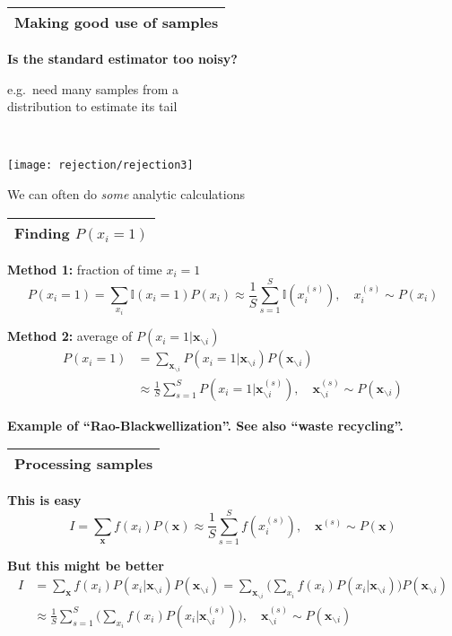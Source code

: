 \documentclass[25pt,landscape]{foils}
\newcommand{\Gray}{\textcolor{mygray}}
\newcommand{\Green}{\textcolor{mypine}}
\newcommand{\myfoilhead}[1]{
\newpage
\vspace*{-1cm}
\Gray{
\begin{tabular*}{\textwidth}{l}
{\bf \Huge #1} \\
\bottomrule
\end{tabular*}}}
\newcommand{\myindent}[1]{
\hspace*{0.1\linewidth}\begin{minipage}{0.89\linewidth}
    #1
\end{minipage}}
\newcommand{\I}{\mathbb I}
\newcommand{\bx}{\mathbf{x}}
\newcommand{\te}{\!=\!}
\begin{document}
\myfoilhead{Making good use of samples}

\vspace*{2cm}

\Green{\bf Is the standard estimator too noisy?}\\[0.2in]
\myindent{e.g.\ need many samples from a\\ distribution to estimate its tail}\\

\vspace*{-2.5cm}

\hfill \texttt{[image: rejection/rejection3]}

\vspace*{0.5cm}
\myindent{We can often do \emph{some} analytic calculations}

\vfill


\myfoilhead{Finding $P(x_i\te 1)$}

\vfill

\Green{{\bf Method 1:}} fraction of time $x_i\te 1$
\[
P(x_i\te 1) = \sum_{x_i} \I(x_i\te 1) P(x_i) \approx \frac{1}{S} \sum_{s=1}^S \I(x_i^{(s)}), \quad x_i^{(s)}\sim P(x_i)
\]

\vfill

\Green{{\bf Method 2:}} average of $P(x_i\te 1|\bx_{\backslash i})$
\[
\begin{split}
P(x_i\te 1) &= \sum_{\bx_{\backslash i}} P(x_i\te 1|\bx_{\backslash i}) P(\bx_{\backslash i})\\
    &\approx \frac{1}{S} \sum_{s=1}^S P(x_i=1|\bx_{\backslash i}^{(s)}), \quad\bx_{\backslash i}^{(s)}\sim P(\bx_{\backslash i})
\end{split}
\]

\vfill
{\textbf{Example of ``Rao-Blackwellization''.  See also ``waste recycling''.}}

\myfoilhead{Processing samples}

\vspace*{1.5cm}

\Green{\bf This is easy}\\[-0.4in]
\[
I = \sum_{\bx} f(x_i) P(\bx) \approx \frac{1}{S} \sum_{s=1}^S f(x_i^{(s)}), \quad \bx^{(s)}\sim P(\bx)
\]

\vfill

\Green{\bf But this might be better}\\[-0.2in]
\[
\begin{split}
I &= \sum_{\bx} f(x_i) P(x_i|\bx_{\backslash i}) P(\bx_{\backslash i})
  = \sum_{\bx_{\backslash i}} \bigg(\sum_{x_i} f(x_i) P(x_i|\bx_{\backslash i})\bigg) P(\bx_{\backslash i})\\
  &\approx \frac{1}{S} \sum_{s=1}^S \bigg(\sum_{x_i} f(x_i) P(x_i|\bx_{\backslash i}^{(s)})\bigg), \quad\bx_{\backslash i}^{(s)}\sim P(\bx_{\backslash i}) \end{split}
\]
\end{document}

